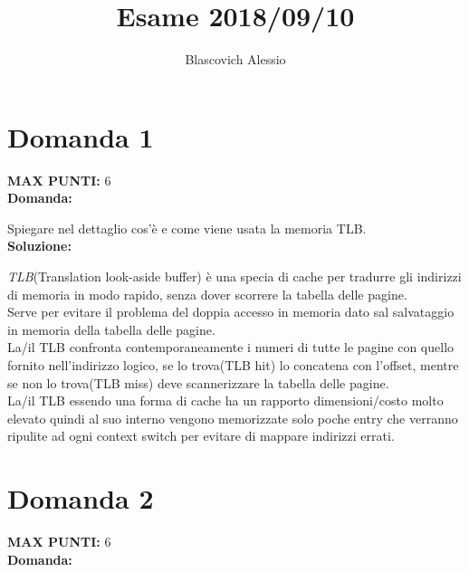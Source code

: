 \documentclass{article}
\title{Esame 2018/09/10}
\author{Blascovich Alessio}
\date{}
\begin{document}
    \maketitle
    \section*{Domanda 1}
    \textbf{MAX PUNTI:} 6\\
    \textbf{Domanda:}


    Spiegare nel dettaglio cos'è e come viene usata la memoria TLB.\\
    \textbf{Soluzione:}


    \emph{TLB}(Translation look-aside buffer) è una specia di cache per tradurre gli indirizzi di memoria in modo rapido, senza dover scorrere la tabella delle pagine.\\
    Serve per evitare il problema del doppia accesso in memoria dato sal salvataggio in memoria della tabella delle pagine.\\
    La/il TLB confronta contemporaneamente i numeri di tutte le pagine con quello fornito nell'indirizzo logico, se lo trova(TLB hit) lo concatena con l'offset, mentre se non lo trova(TLB miss) deve scannerizzare la tabella delle pagine.\\
    La/il TLB essendo una forma di cache ha un rapporto dimensioni/costo molto elevato quindi al suo interno vengono memorizzate solo poche entry che verranno ripulite ad ogni context switch per evitare di mappare indirizzi errati.
    \section*{Domanda 2}
    \textbf{MAX PUNTI:} 6\\
    \textbf{Domanda:}
\end{document}
